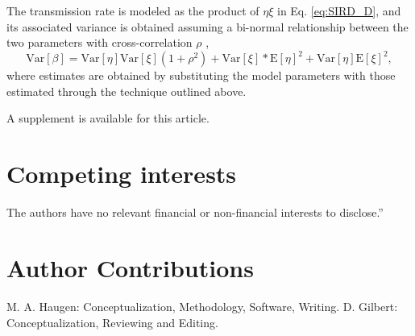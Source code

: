 \documentclass[sn-mathphys]{sn-jnl}%
\theoremstyle{thmstyleone}%
\theoremstyle{thmstyletwo}%
\theoremstyle{thmstylethree}%
\begin{document}

The transmission rate is modeled as the product of $\eta \xi$ in Eq. \ref{eq:SIRD_D}, and its associated variance is obtained assuming a bi-normal relationship between the two parameters with cross-correlation $\rho$ \cite{nadarajah2016distribution},
\begin{equation}
\text{Var}[\beta] = \text{Var}[\eta] \text{Var}[\xi] (1 + \rho^2) + \text{Var}[\xi]*\text{E}[\eta]^2 + \text{Var}[\eta] \text{E}[\xi]^2,
\end{equation}
where estimates are obtained by substituting the model parameters with those estimated through the technique outlined above.


\backmatter


A supplement is available for this article.




\section*{Competing interests}
The authors have no relevant financial or non-financial interests to disclose.”

\section*{Author Contributions}
M. A. Haugen: Conceptualization, Methodology, Software, Writing. D. Gilbert: Conceptualization, Reviewing and Editing.
\end{document}
